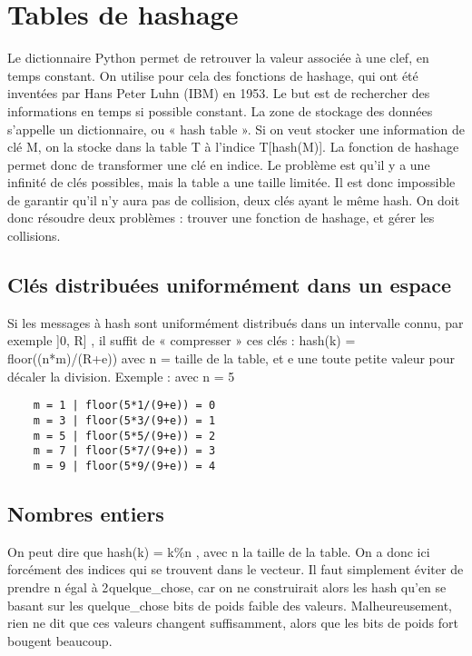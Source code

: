 \documentclass[10pt]{article}
\begin{document}
\section{Tables de hashage}
Le dictionnaire Python permet de retrouver la valeur associée à une clef, en temps constant. On utilise pour cela des fonctions de hashage, qui ont été inventées par Hans Peter Luhn (IBM) en 1953. Le but est de rechercher des informations en temps si possible constant. 
\newline \newline 
La zone de stockage des données s'appelle un dictionnaire, ou « hash table ». Si on veut stocker une information de clé M, on la stocke dans la table T à l'indice T[hash(M)]. La fonction de hashage permet donc de transformer une clé en indice. 
\newline \newline 
Le problème est qu'il y a une infinité de clés possibles, mais la table a une taille limitée. Il est donc impossible de garantir qu'il n'y aura pas de collision, deux clés ayant le même hash. On doit donc résoudre deux problèmes : trouver une fonction de hashage, et gérer les collisions.
\subsection{Clés distribuées uniformément dans un espace}
Si les messages à hash sont uniformément distribués dans un intervalle connu, par exemple ]0, R] , il suffit de « compresser » ces clés : hash(k) = floor((n*m)/(R+e)) avec n = taille de la table, et e une toute petite valeur pour décaler la division. 
\newline \newline 
Exemple : avec n = 5 
\lstset{language=Python}
\lstset{basicstyle=\footnotesize}
\begin{lstlisting}
	m = 1 | floor(5*1/(9+e)) = 0
	m = 3 | floor(5*3/(9+e)) = 1
	m = 5 | floor(5*5/(9+e)) = 2
	m = 7 | floor(5*7/(9+e)) = 3
	m = 9 | floor(5*9/(9+e)) = 4
\end{lstlisting}
\subsection{Nombres entiers}
On peut dire que hash(k) = k\%n , avec n la taille de la table. On a donc ici forcément des indices qui se trouvent dans le vecteur.
\newline \newline 
Il faut simplement éviter de prendre n égal à 2$^{ }$quelque\_chose, car on ne construirait alors les hash qu'en se basant sur les quelque\_chose bits de poids faible des valeurs. Malheureusement, rien ne dit que ces valeurs changent suffisamment, alors que les bits de poids fort bougent beaucoup.
\end{document}

